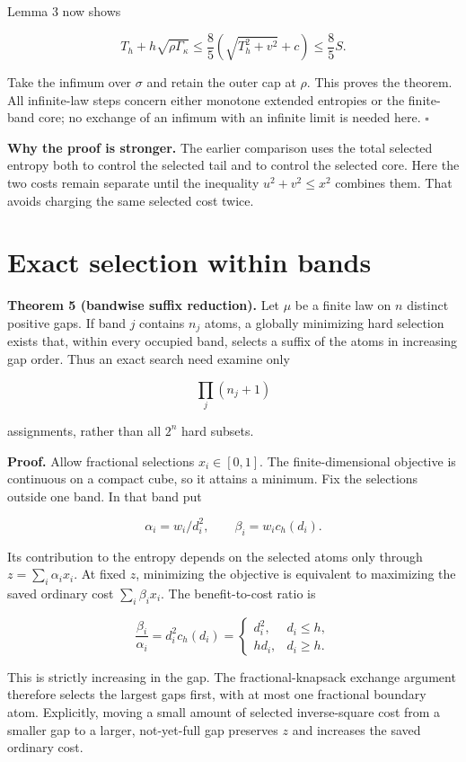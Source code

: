 \documentclass[
  11pt,
  a4paper,
]{article}
\begin{document}
Lemma 3 now shows

\[
T_h+h\sqrt{\rho\Gamma_\kappa}
\le\frac85\left(\sqrt{T_h^2+v^2}+c\right)
\le\frac85S.
\]

Take the infimum over \(\sigma\) and retain the outer cap at \(\rho\).
This proves the theorem. All infinite-law steps concern either monotone
extended entropies or the finite-band core; no exchange of an infimum
with an infinite limit is needed here. \(\square\)

\textbf{Why the proof is stronger.} The earlier comparison uses the
total selected entropy both to control the selected tail and to control
the selected core. Here the two costs remain separate until the
inequality \(u^2+v^2\le x^2\) combines them. That avoids charging the
same selected cost twice.

\section{Exact selection within
bands}\label{exact-selection-within-bands}

\textbf{Theorem 5 (bandwise suffix reduction).} Let \(\mu\) be a finite
law on \(n\) distinct positive gaps. If band \(j\) contains \(n_j\)
atoms, a globally minimizing hard selection exists that, within every
occupied band, selects a suffix of the atoms in increasing gap order.
Thus an exact search need examine only

\[
\prod_j(n_j+1)
\]

assignments, rather than all \(2^n\) hard subsets.

\textbf{Proof.} Allow fractional selections \(x_i\in[0,1]\). The
finite-dimensional objective is continuous on a compact cube, so it
attains a minimum. Fix the selections outside one band. In that band put

\[
\alpha_i=w_i/d_i^2,\qquad \beta_i=w_ic_h(d_i).
\]

Its contribution to the entropy depends on the selected atoms only
through \(z=\sum_i\alpha_ix_i\). At fixed \(z\), minimizing the
objective is equivalent to maximizing the saved ordinary cost
\(\sum_i\beta_ix_i\). The benefit-to-cost ratio is

\[
\frac{\beta_i}{\alpha_i}=d_i^2c_h(d_i)
=\begin{cases}d_i^2,&d_i\le h,\\hd_i,&d_i\ge h.\end{cases}
\]

This is strictly increasing in the gap. The fractional-knapsack exchange
argument therefore selects the largest gaps first, with at most one
fractional boundary atom. Explicitly, moving a small amount of selected
inverse-square cost from a smaller gap to a larger, not-yet-full gap
preserves \(z\) and increases the saved ordinary cost.
\end{document}
